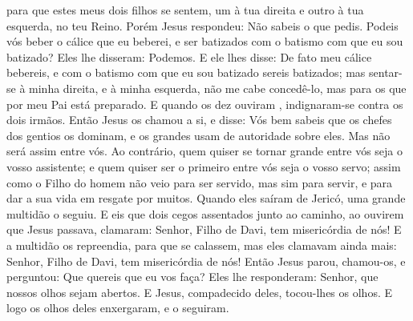 { para que estes meus dois filhos se sentem, um à tua direita e outro à tua esquerda, no teu Reino.
  Porém Jesus respondeu: Não sabeis o que pedis. Podeis vós beber o cálice que eu beberei, e ser batizados com o batismo com que eu sou batizado? Eles lhe disseram: Podemos.
  E ele lhes disse: De fato meu cálice bebereis, e com o batismo com que eu sou batizado sereis batizados; mas sentar-se à minha direita, e à minha esquerda, não me cabe concedê-lo, mas
{} para os que por meu Pai está preparado.
  E quando os dez ouviram
{}, indignaram-se contra os dois irmãos.
  Então Jesus os chamou a si, e disse: Vós bem sabeis que os chefes dos gentios os dominam, e os grandes usam de autoridade sobre eles.
  Mas não será assim entre vós. Ao contrário, quem quiser se tornar grande entre vós seja o vosso assistente;
  e quem quiser ser o primeiro entre vós seja o vosso servo;
  assim como o Filho do homem não veio para ser servido, mas sim para servir, e para dar a sua vida em resgate por muitos.
  Quando eles saíram de Jericó, uma grande multidão o seguiu.
  E eis que dois cegos assentados junto ao caminho, ao ouvirem que Jesus passava, clamaram: Senhor, Filho de Davi, tem misericórdia de nós!
  E a multidão os repreendia, para que se calassem, mas eles clamavam ainda mais: Senhor, Filho de Davi, tem misericórdia de nós!
  Então Jesus parou, chamou-os, e perguntou: Que quereis que eu vos faça?
  Eles lhe responderam: Senhor, que nossos olhos sejam abertos.
  E Jesus, compadecido deles, tocou-lhes os olhos. E logo os olhos deles enxergaram, e o seguiram.
\par }

